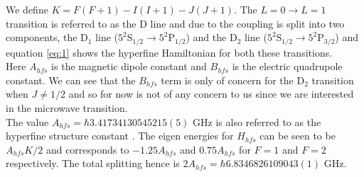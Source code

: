 \documentclass[%
 reprint,
 amsmath,amssymb,
 aps,
]{revtex4-2}
\begin{document}
We define $K = F(F+1) - I(I+1) - J(J+1)$. The $L=0\to L=1$ transition is referred to as the D line and due to the coupling is split into two components, the D$_1$ line ($5^2$S$_{1/2}\to5^2$P$_{1/2}$) and the D$_2$ line ($5^2$S$_{1/2}\to5^2$P$_{3/2}$) and equation \ref{eq:1} shows the hyperfine Hamiltonian for both these transitions.\\
Here $A_{hfs}$ is the magnetic dipole constant and $B_{hfs}$ is the electric quadrupole constant. We can see that the $B_{hfs}$ term is only of concern for the D$_2$ transition when $J\neq 1/2$ and so for now is not of any concern to us since we are interested in the microwave transition.\\
The value $A_{hfs} = \hbar 3.41734130545215(5)$ GHz is also referred to as the hyperfine structure constant \cite{hyperfineconst}. The eigen energies for $H_{hfs}$ can be seen to be $A_{hfs}K/2$ and corresponds to $-1.25A_{hfs}$ and $0.75A_{hfs}$ for $F=1$ and $F=2$ respectively. The total splitting hence is $2A_{hfs} = \hbar 6.8346826109043(1)$ GHz.
\end{document}
